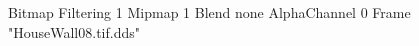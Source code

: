 {Bitmap
	{Filtering 1}
	{Mipmap 1}
	{Blend none}
	{AlphaChannel 0}
	{Frame "HouseWall08.tif.dds"}
}
